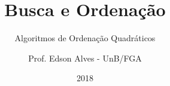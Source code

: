 \title{Busca e Ordenação}
\subtitle{Algoritmos de Ordenação Quadráticos}
\author{Prof. Edson Alves - UnB/FGA}
\date{2018}
